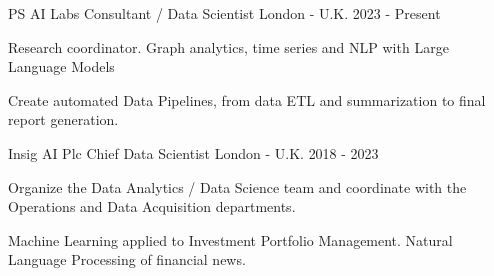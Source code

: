 


\begin{cventries}





\cventry
{PS AI Labs} %
{Consultant / Data Scientist} %
{London - U.K.} %
{2023 - Present} %
{ %
\begin{cvitems}
\item {Research coordinator. Graph analytics, time series and NLP with Large Language Models }
\item {Create automated Data Pipelines, from data ETL and summarization to final report generation.}
\end{cvitems}
}


\cventry
{Insig AI Plc} %
{Chief Data Scientist} %
{London - U.K.} %
{2018 - 2023} %
{ %
\begin{cvitems}
\item {Organize the Data Analytics / Data Science team and coordinate with the Operations and Data Acquisition departments.}
\item {Machine Learning applied to Investment Portfolio Management. Natural Language Processing of financial news.}
\end{cvitems}
}


\end{cventries}
